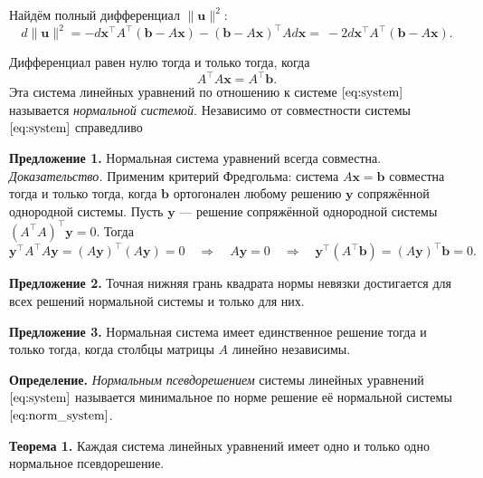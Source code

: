 \documentclass[11pt,a4paper]{article}
\begin{document}
Найдём полный дифференциал \(\|\mathbf{u}\|^2\): \[
  d\|\mathbf{u}\|^2 = -d\mathbf{x}^\top A^\top (\mathbf{b}-A\mathbf{x}) - (\mathbf{b}-A\mathbf{x})^\top A d\mathbf{x} = \
  -2d\mathbf{x}^\top A^\top (\mathbf{b} - A\mathbf{x}).
\]

Дифференциал равен нулю тогда и только тогда, когда
\[
  A^\top A \mathbf{x} = A^\top \mathbf{b}. \tag{2}\label{eq:norm_system}
\]
Эта система линейных уравнений по отношению к системе
\(\eqref{eq:system}\) называется \emph{нормальной системой}.
Независимо от совместности системы \(\eqref{eq:system}\) справедливо

\textbf{Предложение 1.} Нормальная система уравнений всегда совместна.\\
\emph{Доказательство.} Применим критерий Фредгольма: система
\(A\mathbf{x}=\mathbf{b}\) совместна тогда и только тогда, когда
\(\mathbf{b}\) ортогонален любому решению \(\mathbf{y}\) сопряжённой
однородной системы. Пусть \(\mathbf{y}\) --- решение сопряжённой
однородной системы \((A^\top A)^\top \mathbf{y} = 0\). Тогда \[
  \mathbf{y}^\top A^\top A \mathbf{y} = (A \mathbf{y})^\top (A \mathbf{y}) = 0 \quad \Rightarrow \quad
  A \mathbf{y} = 0 \quad \Rightarrow \quad
  \mathbf{y}^\top (A^\top \mathbf{b}) = (A\mathbf{y})^\top \mathbf{b} = 0.
\]

\textbf{Предложение 2.} Точная нижняя грань квадрата нормы невязки
достигается для всех решений нормальной системы и только для них.

\textbf{Предложение 3.} Нормальная система имеет единственное решение
тогда и только тогда, когда столбцы матрицы \(A\) линейно независимы.


\textbf{Определение.} \emph{Нормальным псевдорешением} системы линейных уравнений \(\eqref{eq:system}\) называется минимальное по норме решение её нормальной системы \(\eqref{eq:norm_system}\).

\textbf{Теорема 1.} Каждая система линейных уравнений имеет одно и только одно нормальное псевдорешение.

\end{document}
